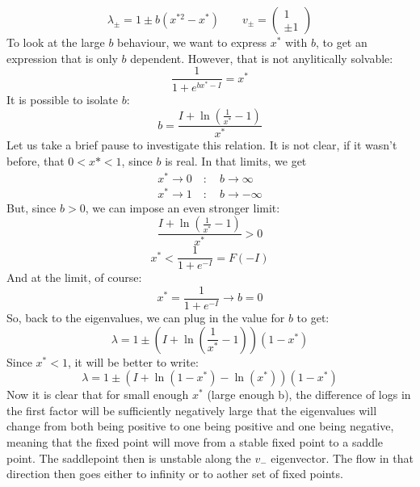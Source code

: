 \documentclass{article}
\begin{document}
\begin{equation}
    \lambda_{\pm} = 1 \pm b\left(x^{*2} - x^*\right)
    \qquad
    v_{\pm} = \begin{pmatrix}
        1 \\ \pm 1
    \end{pmatrix}
\end{equation}
To look at the large $b$ behaviour, we want to express $x^*$ with $b$, to get an expression that is only $b$ dependent. However, that is not anylitically solvable:
\begin{equation}
    \frac{1}{1 + e^{bx^*-I}} = x^*
\end{equation}
It is possible to isolate $b$:
\begin{equation}
    b = \frac{I + \ln(\frac{1}{x^*} - 1)}{x^*}
\end{equation}
Let us take a brief pause to investigate this relation. It is not clear, if it wasn't before, that $0 < x* < 1$, since $b$ is real. In that limits, we get
\begin{equation}
\begin{gathered}
    x^* \rightarrow 0 \quad : \quad b \rightarrow \infty
    \\
    x^* \rightarrow 1 \quad : \quad b \rightarrow -\infty
\end{gathered}
\end{equation}
But, since $b > 0$, we can impose an even stronger limit:
\begin{equation}
    \frac{I + \ln(\frac{1}{x^*} - 1)}{x^*} > 0
\end{equation}
\begin{equation}
    x^* < \frac{1}{1 + e^{-I}} = F(-I)
\end{equation}
And at the limit, of course:
\begin{equation}
    x^* = \frac{1}{1 + e^{-I}} \rightarrow b = 0
\end{equation}
So, back to the eigenvalues, we can plug in the value for $b$ to get:
\begin{equation}
    \lambda = 1 \pm \left(I + \ln(\frac{1}{x^*} - 1)\right)\left(1 - x^{*}\right)
\end{equation}
Since $x^* < 1$, it will be better to write:
\begin{equation}
    \lambda = 1 \pm \left(I + \ln(1 - x^*) - \ln(x^*)\right)\left(1 - x^{*}\right)
\end{equation}
Now it is clear that for small enough $x^*$ (large enough b), the difference of logs in the first factor will be sufficiently negatively large that the eigenvalues will change from both being positive to one being positive and one being negative, meaning that the fixed point will move from a stable fixed point to a saddle point. The saddlepoint then is unstable along the $v_{-}$ eigenvector. The flow in that direction then goes either to infinity or to aother set of fixed points.
\end{document}

